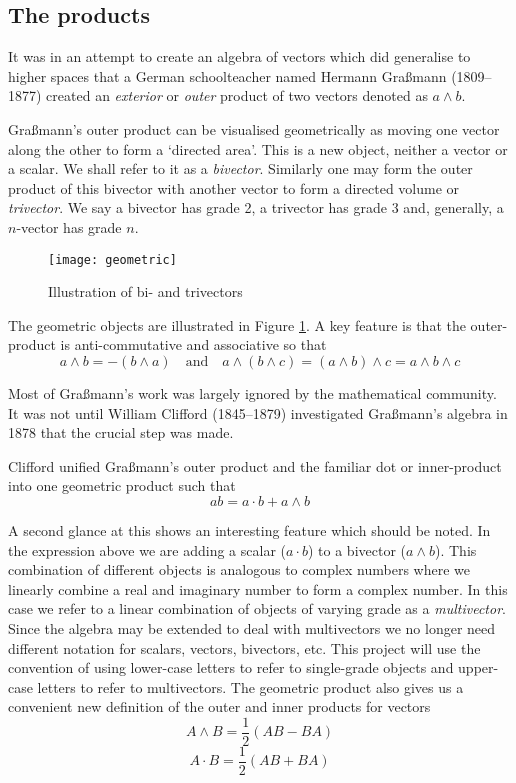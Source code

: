 \subsection{The products}

It was in an attempt \cite{GA:grassmann} to create an algebra of vectors which 
did generalise
to higher spaces that a German schoolteacher named Hermann 
Gra{\ss}mann (1809--1877) created an \emph{exterior} 
or \emph{outer} product of two
vectors denoted as $a \wedge b$. 

Gra{\ss}mann's outer product can be visualised geometrically as moving
one vector along the other to form a `directed area'. This is a new object,
neither a vector or a scalar. We shall refer to it as a \emph{bivector}.
Similarly one may form the outer product of this bivector with another
vector to form a directed volume or \emph{trivector}. We say a 
bivector has grade 2, a trivector has grade 3 and, generally, a
$n$-vector has grade $n$.

\begin{figure}
\centering
\texttt{[image: geometric]}
\caption{Illustration of bi- and trivectors\label{fig:geometric}}
\end{figure}

The geometric objects are illustrated in Figure \ref{fig:geometric}. A 
key feature is that the outer-product is anti-commutative and 
associative so that
\begin{displaymath}
a \wedge b = - ( b \wedge a)\quad\mbox{and}\quad 
a \wedge (b \wedge c) = (a \wedge b) \wedge c = a \wedge b \wedge c
\end{displaymath}

Most of Gra{\ss}mann's work was largely ignored by the mathematical community.
It was not until William Clifford (1845--1879) investigated Gra{\ss}mann's
algebra in 1878 \cite{GA:clifford} that the crucial step was made.

Clifford unified Gra{\ss}mann's outer product and the familiar dot
or inner-product into one geometric product such that
\begin{displaymath}
ab = a\cdot b + a \wedge b
\end{displaymath}

A second glance at this shows an interesting feature which should be noted.
In the expression above we are adding a scalar ($a \cdot b$) to a 
bivector ($a \wedge b$). This combination of different objects is
analogous to complex numbers where we linearly combine
a real and imaginary number to form a complex number. In this case we
refer to a linear combination of objects of varying grade as a
\emph{multivector}. Since the algebra may be extended to deal with
multivectors we no longer need different notation for scalars, vectors,
bivectors, etc. This project will use the convention of using lower-case
letters to refer to single-grade objects and upper-case letters to refer
to multivectors. The geometric product also gives us a convenient new
definition of the outer and inner products for vectors
\[
A \wedge B = \frac{1}{2}(AB - BA)
\]
\[
A \cdot B = \frac{1}{2}(AB + BA)
\]

